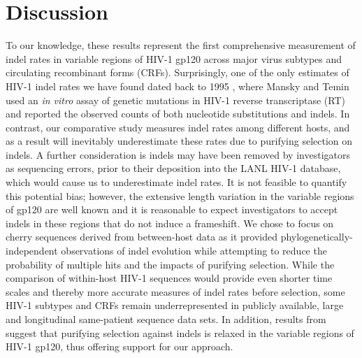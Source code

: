 \documentclass[12pt]{article}
\newcommand{\todo}[2]{\hl{\textbf{#1:} #2}}
\begin{document}
\section * {Discussion}

To our knowledge, these results represent the first comprehensive measurement of indel rates in variable regions of HIV-1 gp120 across major virus subtypes and circulating recombinant forms (CRFs).
Surprisingly, one of the only estimates of HIV-1 indel rates we have found dated back to 1995 \citep{Mansky:1995}, where Mansky and Temin used an \textit{in vitro} assay of genetic mutations in HIV-1 reverse transcriptase (RT) and reported the observed counts of both nucleotide substitutions and indels.
In contrast, our comparative study measures indel rates among different hosts, and as a result will inevitably underestimate these rates due to purifying selection on indels.
A further consideration is indels may have been removed by investigators as sequencing errors, prior to their deposition into the LANL HIV-1 database, which would cause us to underestimate indel rates. 
It is not feasible to quantify this potential bias; however, the extensive length variation in the variable regions of gp120 are well known and it is reasonable to expect investigators to accept indels in these regions that do not induce a frameshift.
We chose to focus on cherry sequences derived from between-host data as it provided phylogenetically-independent observations of indel evolution while attempting to reduce the probability of multiple hits and the impacts of purifying selection.  
While the comparison of within-host HIV-1 sequences would provide even shorter time scales and thereby more accurate measures of indel rates before selection, some HIV-1 subtypes and CRFs remain underrepresented in publicly available, large and longitudinal same-patient sequence data sets.
In addition, results from \citet{wood2009hiv} suggest that purifying selection against indels is relaxed in the variable regions of HIV-1 gp120, thus offering support for our approach.
\end{document}
